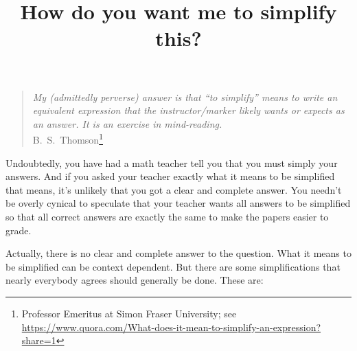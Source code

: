 \documentclass[12pt,fleqn]{article}
\title{How do you want me to simplify this?}
\begin{document}
\maketitle
\begin{quote}
\emph{My (admittedly perverse) answer is that ``to simplify''  means to write an equivalent expression that the instructor/marker likely wants or expects as an answer. It is an exercise in mind-reading.} \\  \phantom{xxxxx} \hfill   {\mbox{\sc B.\ S.\ Thomson}\footnote{\tiny Professor Emeritus at Simon Fraser University;  see  \url{https://www.quora.com/What-does-it-mean-to-simplify-an-expression?share=1}} }
\end{quote}


Undoubtedly, you have had a math teacher tell you that you must simply your answers.  And if you asked your teacher exactly what it means to be simplified that means, it's unlikely that you got a clear and complete answer.   You needn't be overly cynical to speculate that your teacher wants all answers to be simplified so that all correct answers are exactly the same to make the papers easier to grade.  


Actually, there is no clear and complete answer to the question. What it means to be simplified can be context dependent. But there are some simplifications that nearly everybody agrees should generally be done. These are:
\end{document}
